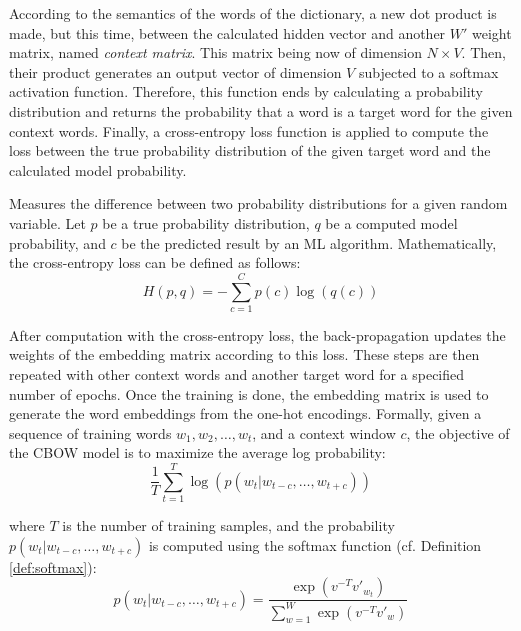 According to the semantics of the words of the dictionary, a new dot product is
made, but this time, between the calculated hidden vector and another $W'$
weight matrix, named \emph{context matrix}. This matrix being now of dimension
$N \times V$. Then, their product generates an output vector of dimension $V$
subjected to a softmax activation function. Therefore, this function ends by
calculating a probability distribution and returns the probability that a word
is a target word for the given context words. Finally, a cross-entropy loss
function is applied to compute the loss between the true probability
distribution of the given target word and the calculated model probability.

\begin{definition}
  Measures the difference between two probability distributions for a given
  random variable. Let $p$ be a true probability distribution, $q$ be a computed
  model probability, and $c$ be the predicted result by an ML
  algorithm. Mathematically, the cross-entropy loss can be defined as follows:
  \begin{equation}
    H(p, q) = -\sum_{c=1}^Cp(c)\log\left(q(c)\right)
    \label{eq:cross-entropy}
  \end{equation}
  \label{def:cross-entropy}
\end{definition}

After computation with the cross-entropy loss, the back-propagation updates the
weights of the embedding matrix according to this loss. These steps are then
repeated with other context words and another target word for a specified number
of epochs. Once the training is done, the embedding matrix is used to generate
the word embeddings from the one-hot encodings. Formally, given a sequence of
training words $w_1, w_2, \dotsc, w_t$, and a context window $c$, the objective
of the CBOW model is to maximize the average log probability:
\begin{equation}
  \frac{1}{T}\sum_{t=1}^T\log\left(p\left(w_t|w_{t-c}, \ldots, w_{t + c}\right)\right)
  \label{eq:w2v:cbow:probability}
\end{equation}

where $T$ is the number of training samples, and the probability
$p\left(w_t|w_{t-c}, \ldots, w_{t + c}\right)$ is computed using the softmax
function (cf. Definition \ref{def:softmax}):
\begin{equation}
  p\left(w_t|w_{t-c}, \ldots, w_{t + c}\right) =
  \frac{\exp\left(v^{-T}v'_{w_t}\right)}{\sum_{w=1}^W\exp\left(v^{-T}v'_w\right)}
  \label{eq:w2v:cbow:probability:details}
\end{equation}

